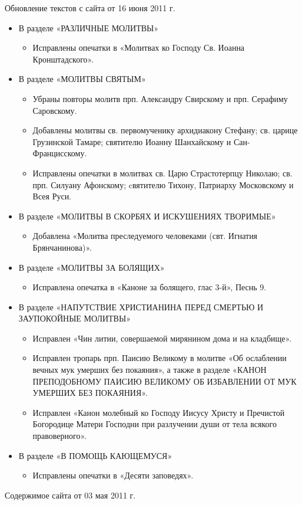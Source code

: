 Обновление текстов с сайта от 16 июня 2011 г.
\begin{itemize}

\item В разделе «РАЗЛИЧНЫЕ МОЛИТВЫ»
\begin{itemize}
\item Исправлены опечатки в «Молитвах ко Господу Св. Иоанна Кронштадского».
\end{itemize}

\item В разделе «МОЛИТВЫ СВЯТЫМ»
\begin{itemize}
\item Убраны повторы молитв прп. Александру Свирскому и прп. Серафиму Саровскому.
\item Добавлены молитвы св. первомученику архидиакону Стефану; св. царице Грузинской Тамаре; святителю Иоанну Шанхайскому и Сан-Францисскому.
\item Исправлены опечатки в молитвах св. Царю Страстотерпцу Николаю; св. прп. Силуану Афонскому; cвятителю Тихону, Патриарху Московскому и Всея Руси.
\end{itemize}

\item В разделе «МОЛИТВЫ В СКОРБЯХ И ИСКУШЕНИЯХ ТВОРИМЫЕ»
\begin{itemize}
\item Добавлена «Молитва преследуемого человеками (свт. Игнатия Брянчанинова)».
\end{itemize}

\item В разделе «МОЛИТВЫ ЗА БОЛЯЩИХ»
\begin{itemize}
\item Исправлена опечатка в «Каноне за болящего, глас 3-й», Песнь 9.
\end{itemize}

\item В разделе «НАПУТСТВИЕ ХРИСТИАНИНА ПЕРЕД СМЕРТЬЮ И ЗАУПОКОЙНЫЕ МОЛИТВЫ»
\begin{itemize}
\item Исправлен «Чин литии, совершаемой мирянином дома и на кладбище».
\item Исправлен тропарь прп. Паисию Великому в молитве «Об ослаблении вечных мук умерших без покаяния», а также в разделе «КАНОН ПРЕПОДОБНОМУ ПАИСИЮ ВЕЛИКОМУ ОБ ИЗБАВЛЕНИИ ОТ МУК УМЕРШИХ БЕЗ ПОКАЯНИЯ».
\item Исправлен «Канон молебный ко Господу Иисусу Христу и Пречистой Богородице Матери Господни при разлучении души от тела всякого правоверного».
\end{itemize}

\item В разделе «В ПОМОЩЬ КАЮЩЕМУСЯ»
\begin{itemize}
\item Исправлены опечатки в «Десяти заповедях».
\end{itemize}


\end{itemize}



Содержимое сайта от 03 мая 2011 г.

\mychapterending

